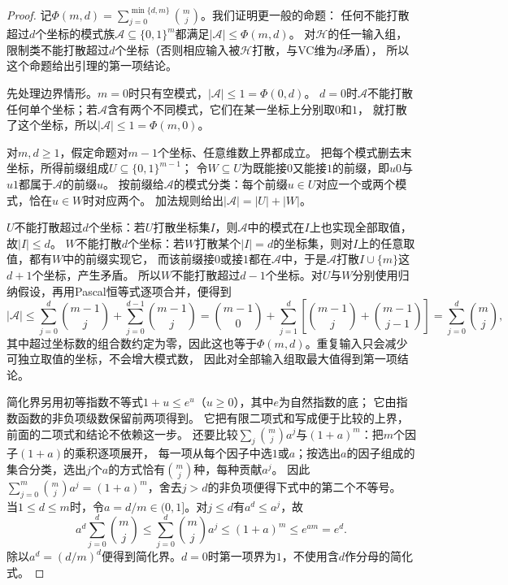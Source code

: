 \begin{proof}
记$\Phi(m,d)=\sum_{j=0}^{\min\{d,m\}}\binom mj$。我们证明更一般的命题：
任何不能打散超过$d$个坐标的模式族$\mathcal A\subseteq\{0,1\}^m$都满足$|\mathcal A|\leq\Phi(m,d)$。
对$\mathcal H$的任一输入组，限制类不能打散超过$d$个坐标（否则相应输入被$\mathcal H$打散，与VC维为$d$矛盾），
所以这个命题给出引理的第一项结论。

先处理边界情形。$m=0$时只有空模式，$|\mathcal A|\leq1=\Phi(0,d)$。
$d=0$时$\mathcal A$不能打散任何单个坐标；若$\mathcal A$含有两个不同模式，它们在某一坐标上分别取$0$和$1$，
就打散了这个坐标，所以$|\mathcal A|\leq1=\Phi(m,0)$。

对$m,d\geq1$，假定命题对$m-1$个坐标、任意维数上界都成立。
把每个模式删去末坐标，所得前缀组成$U\subseteq\{0,1\}^{m-1}$；
令$W\subseteq U$为既能接$0$又能接$1$的前缀，即$u0$与$u1$都属于$\mathcal A$的前缀$u$。
按前缀给$\mathcal A$的模式分类：每个前缀$u\in U$对应一个或两个模式，恰在$u\in W$时对应两个。
加法规则给出$|\mathcal A|=|U|+|W|$。

$U$不能打散超过$d$个坐标：若$U$打散坐标集$I$，则$\mathcal A$中的模式在$I$上也实现全部取值，故$|I|\leq d$。
$W$不能打散$d$个坐标：若$W$打散某个$|I|=d$的坐标集，则对$I$上的任意取值，都有$W$中的前缀实现它，
而该前缀接$0$或接$1$都在$\mathcal A$中，于是$\mathcal A$打散$I\cup\{m\}$这$d+1$个坐标，产生矛盾。
所以$W$不能打散超过$d-1$个坐标。对$U$与$W$分别使用归纳假设，再用Pascal恒等式逐项合并，便得到
\[
  |\mathcal A|
  \leq\sum_{j=0}^{d}\binom{m-1}{j}
       +\sum_{j=0}^{d-1}\binom{m-1}{j}
  =\binom{m-1}0+\sum_{j=1}^{d}\left[\binom{m-1}j+\binom{m-1}{j-1}\right]
  =\sum_{j=0}^{d}\binom mj,
\]
其中超过坐标数的组合数约定为零，因此这也等于$\Phi(m,d)$。重复输入只会减少可独立取值的坐标，不会增大模式数，
因此对全部输入组取最大值得到第一项结论。

简化界另用初等指数不等式$1+u\leq e^u$（$u\geq0$），其中$e$为自然指数的底；
它由指数函数的非负项级数保留前两项得到。
它把有限二项式和写成便于比较的上界，前面的二项式和结论不依赖这一步。
还要比较$\sum_j\binom mja^j$与$(1+a)^m$：把$m$个因子$(1+a)$的乘积逐项展开，
每一项从每个因子中选$1$或$a$；按选出$a$的因子组成的集合分类，选出$j$个$a$的方式恰有$\binom mj$种，每种贡献$a^j$。
因此$\sum_{j=0}^m\binom mja^j=(1+a)^m$，舍去$j>d$的非负项便得下式中的第二个不等号。
当\(1\leq d\leq m\)时，令\(a=d/m\in(0,1]\)。对\(j\leq d\)有\(a^d\leq a^j\)，故
\[
  a^d\sum_{j=0}^{d}\binom mj
  \leq\sum_{j=0}^{d}\binom mj a^j
  \leq(1+a)^m\leq e^{am}=e^d.
\]
除以\(a^d=(d/m)^d\)便得到简化界。\(d=0\)时第一项界为\(1\)，不使用含\(d\)作分母的简化式。
\end{proof}

